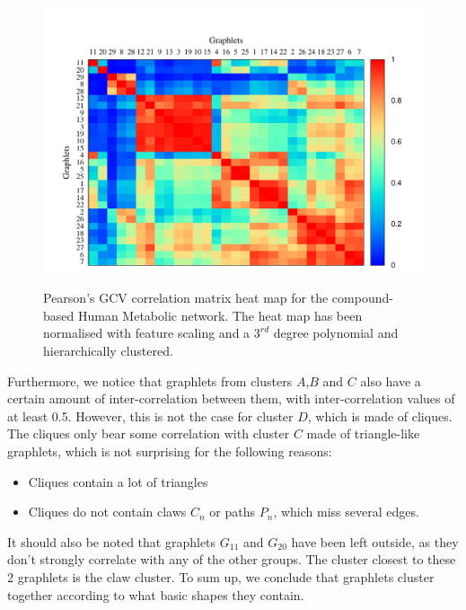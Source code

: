  
\begin{figure}[H]
  \centering
  \hbox{\hspace{-1cm}
  \includegraphics[scale=1.0]{../code/final_results/hsa_metabolic_network/heatmap_pearsons_hclust_hsa_metabolic_network-poly-32.pdf}}
  \caption[Pearson's GCV correlation matrix heat map for the compound-based Human Metabolic network.]{Pearson's GCV correlation matrix heat map for the compound-based Human Metabolic network. The heat map has been normalised with feature scaling and a $3^{rd}$ degree polynomial and hierarchically clustered.}
  \label{meta_heatmap_hclust_3}
\end{figure}

 
Furthermore, we notice that graphlets from clusters $A$,$B$ and $C$ also have a certain amount of inter-correlation between them, with inter-correlation values of at least 0.5. However, this is not the case for cluster $D$, which is made of cliques. The cliques only bear some correlation with cluster $C$ made of triangle-like graphlets, which is not surprising for the following reasons:
\begin{itemize}
 \item Cliques contain a lot of triangles
 \item Cliques do not contain claws $C_n$ or paths $P_n$, which miss several edges.
\end{itemize}

It should also be noted that graphlets $G_{11}$ and $G_{20}$ have been left outside, as they don't strongly correlate with any of the other groups. The cluster closest to these 2 graphlets is the claw cluster. To sum up, we conclude that graphlets cluster together according to what basic shapes they contain.


